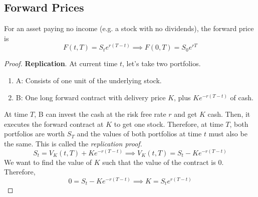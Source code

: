 \documentclass{article}
\begin{document}
  \subsection{Forward Prices}

    \begin{theorem}
      For an asset paying no income (e.g. a stock with no dividends), the forward price is 
      \begin{equation}
        F(t, T) = S_t e^{r (T - t)} \implies F(0, T) = S_0 e^{r T}
      \end{equation} 
    \end{theorem}
    \begin{proof}
      \textbf{Replication}. At current time $t$, let's take two portfolios. 
      \begin{enumerate}
        \item A: Consists of one unit of the underlying stock. 
        \item B: One long forward contract with delivery price $K$, plus $K e^{-r(T - t)}$ of cash. 
      \end{enumerate}
      At time $T$, B can invest the cash at the risk free rate $r$ and get $K$ cash. Then, it executes the forward contract at $K$ to get one stock. Therefore, at time $T$, both portfolios are worth $S_T$ and the values of both portfolios at time $t$ must also be the same. This is called the \textit{replication proof}. 
      \begin{equation}
        S_t = V_K (t, T) + K e^{-r (T - t)} \implies V_K (t, T)= S_t - K e^{-r (T - t)}
      \end{equation}
      We want to find the value of $K$ such that the value of the contract is $0$. Therefore, 
      \begin{equation}
        0 = S_t - K e^{-r (T - t)} \implies K = S_t e^{r (T - t)}
      \end{equation}
    \end{proof}
\end{document}
